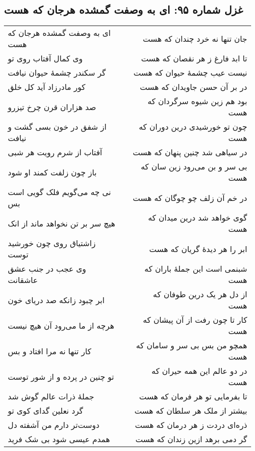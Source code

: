 \begin{center}
\section*{غزل شماره ۹۵: ای به وصفت گمشده هرجان که هست}
\label{sec:095}
\begin{longtable}{l p{0.5cm} r}
ای به وصفت گمشده هرجان که هست
&&
جان تنها نه خرد چندان که هست
\\
وی کمال آفتاب روی تو
&&
تا ابد فارغ ز هر نقصان که هست
\\
گر سکندر چشمهٔ حیوان نیافت
&&
نیست عیب چشمهٔ حیوان که هست
\\
کور مادرزاد آید کل خلق
&&
در بر آن حسن جاویدان که هست
\\
صد هزاران قرن چرخ تیزرو
&&
بود هم زین شیوه سرگردان که هست
\\
از شفق در خون بسی گشت و نیافت
&&
چون تو خورشیدی درین دوران که هست
\\
آفتاب از شرم رویت هر شبی
&&
در سیاهی شد چنین پنهان که هست
\\
باز چون زلفت کمند او شود
&&
بی سر و بن می‌رود زین سان که هست
\\
نی چه می‌گویم فلک گویی است بس
&&
در خم آن زلف چو چوگان که هست
\\
هیچ سر بر تن نخواهد ماند از انک
&&
گوی خواهد شد درین میدان که هست
\\
زاشتیاق روی چون خورشید توست
&&
ابر را هر دیدهٔ گریان که هست
\\
وی عجب در جنب عشق عاشقانت
&&
شبنمی است این جملهٔ باران که هست
\\
ابر چبود زانکه صد دریای خون
&&
از دل هر یک درین طوفان که هست
\\
هرچه از ما می‌رود آن هیچ نیست
&&
کار تا چون رفت از آن پیشان که هست
\\
کار تنها نه مرا افتاد و بس
&&
همچو من بس بی سر و سامان که هست
\\
تو چنین در پرده و از شور توست
&&
در دو عالم این همه حیران که هست
\\
جملهٔ ذرات عالم گوش شد
&&
تا بفرمایی تو هر فرمان که هست
\\
گرد نعلین گدای کوی تو
&&
بیشتر از ملک هر سلطان که هست
\\
دوست‌تر دارم من آشفته دل
&&
ذره‌ای دردت ز هر درمان که هست
\\
همدم عیسی شود بی شک فرید
&&
گر دمی برهد ازین زندان که هست
\\
\end{longtable}
\end{center}
